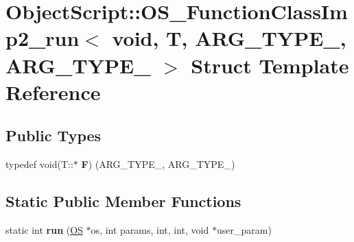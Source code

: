 \hypertarget{struct_object_script_1_1_o_s___function_class_imp2__run_3_01void_00_01_t_00_01_01_01_a_r_g___t_yfb7f4d3cd2468e5537acfee9f4196332}{}\section{Object\+Script\+:\+:O\+S\+\_\+\+Function\+Class\+Imp2\+\_\+run$<$ void, T, A\+R\+G\+\_\+\+T\+Y\+P\+E\+\_, A\+R\+G\+\_\+\+T\+Y\+P\+E\+\_ $>$ Struct Template Reference}
\label{struct_object_script_1_1_o_s___function_class_imp2__run_3_01void_00_01_t_00_01_01_01_a_r_g___t_yfb7f4d3cd2468e5537acfee9f4196332}
\subsection*{Public Types}
\begin{DoxyCompactItemize}
\item 
typedef void(T\+::$\ast$ {\bfseries F}) (A\+R\+G\+\_\+\+T\+Y\+P\+E\+\_, A\+R\+G\+\_\+\+T\+Y\+P\+E\+\_)\hypertarget{struct_object_script_1_1_o_s___function_class_imp2__run_3_01void_00_01_t_00_01_01_01_a_r_g___t_yfb7f4d3cd2468e5537acfee9f4196332_a739fb5edf0985509678082a4e4b8bb99}{}\label{struct_object_script_1_1_o_s___function_class_imp2__run_3_01void_00_01_t_00_01_01_01_a_r_g___t_yfb7f4d3cd2468e5537acfee9f4196332_a739fb5edf0985509678082a4e4b8bb99}

\end{DoxyCompactItemize}
\subsection*{Static Public Member Functions}
\begin{DoxyCompactItemize}
\item 
static int {\bfseries run} (\hyperlink{class_object_script_1_1_o_s}{OS} $\ast$os, int params, int, int, void $\ast$user\+\_\+param)\hypertarget{struct_object_script_1_1_o_s___function_class_imp2__run_3_01void_00_01_t_00_01_01_01_a_r_g___t_yfb7f4d3cd2468e5537acfee9f4196332_a090c0f7a1467ea237208b1301b086be8}{}\label{struct_object_script_1_1_o_s___function_class_imp2__run_3_01void_00_01_t_00_01_01_01_a_r_g___t_yfb7f4d3cd2468e5537acfee9f4196332_a090c0f7a1467ea237208b1301b086be8}

\end{DoxyCompactItemize}


